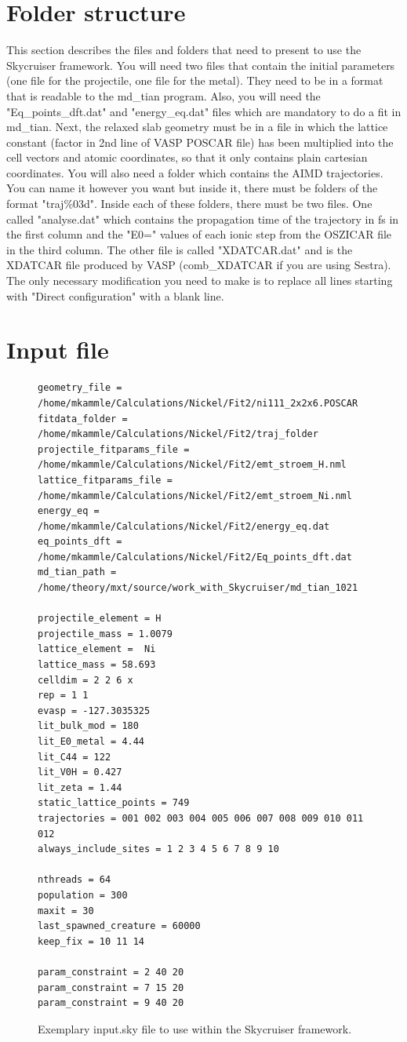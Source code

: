 \documentclass[twoside, 11pt, titlepage, captions=nooneline, a4paper, headsepline]{scrbook}%
\newcommand{\9}{\mathrm}
\newcommand{\0}{\,\mathrm}
\begin{document}
\section{Folder structure}
This section describes the files and folders that need to present to use the Skycruiser framework. You will need two files that contain the initial parameters (one file for the projectile, one file for the metal). They need to be in a format that is readable to the md\_tian program. Also, you will need the "Eq\_points\_dft.dat" and "energy\_eq.dat" files which are mandatory to do a fit in md\_tian. Next, the relaxed slab geometry must be in a file in which the lattice constant (factor in 2nd line of VASP POSCAR file) has been multiplied into the cell vectors and atomic coordinates, so that it only contains plain cartesian coordinates. You will also need a folder which contains the AIMD trajectories. You can name it however you want but inside it, there must be folders of the format "traj\%03d". Inside each of these folders, there must be two files. One called "analyse.dat" which contains the propagation time of the trajectory in fs in the first column and the "E0=" values of each ionic step from the OSZICAR file in the third column. The other file is called "XDATCAR.dat" and is the XDATCAR file produced by VASP (comb\_XDATCAR if you are using Sestra). The only necessary modification you need to make is to replace all lines starting with "Direct configuration" with a blank line.

\section{Input file}
\begin{figure}
\begin{verbatim}
geometry_file = /home/mkammle/Calculations/Nickel/Fit2/ni111_2x2x6.POSCAR
fitdata_folder = /home/mkammle/Calculations/Nickel/Fit2/traj_folder
projectile_fitparams_file = /home/mkammle/Calculations/Nickel/Fit2/emt_stroem_H.nml
lattice_fitparams_file = /home/mkammle/Calculations/Nickel/Fit2/emt_stroem_Ni.nml
energy_eq = /home/mkammle/Calculations/Nickel/Fit2/energy_eq.dat
eq_points_dft = /home/mkammle/Calculations/Nickel/Fit2/Eq_points_dft.dat
md_tian_path = /home/theory/mxt/source/work_with_Skycruiser/md_tian_1021

projectile_element = H
projectile_mass = 1.0079
lattice_element =  Ni
lattice_mass = 58.693
celldim = 2 2 6 x
rep = 1 1
evasp = -127.3035325
lit_bulk_mod = 180
lit_E0_metal = 4.44
lit_C44 = 122
lit_V0H = 0.427
lit_zeta = 1.44
static_lattice_points = 749
trajectories = 001 002 003 004 005 006 007 008 009 010 011 012
always_include_sites = 1 2 3 4 5 6 7 8 9 10

nthreads = 64
population = 300
maxit = 30
last_spawned_creature = 60000
keep_fix = 10 11 14

param_constraint = 2 40 20
param_constraint = 7 15 20
param_constraint = 9 40 20
\end{verbatim}
\caption{Exemplary input.sky file to use within the Skycruiser framework.}
\label{SkycruiserInput}
\end{figure}
\end{document}
